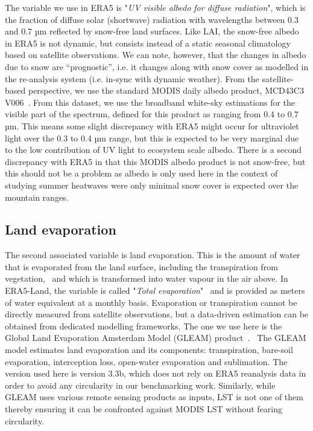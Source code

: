 \documentclass[gmd, manuscript]{copernicus}
\begin{document}
The variable we use in ERA5 is "\emph{UV visible albedo for diffuse radiation}", 
which is the fraction of diffuse solar (shortwave) radiation with wavelengths between 
0.3 and 0.7 µm reflected by snow-free 
land surfaces. Like LAI, the snow-free albedo in ERA5 is not dynamic, but consists instead of a static seasonal climatology based on satellite observations. We can note, however, that the changes in albedo due to snow are “prognostic”, i.e. it changes along with snow cover as modelled in the re-analysis system (i.e. in-sync with dynamic weather).  
From the satellite-based perspective, we use the 
standard MODIS daily albedo product, MCD43C3 V006~\citep{Schaaf_2015}. From this
dataset, we use the broadband white-sky estimations for the visible part of the spectrum, 
defined for this product as ranging from 0.4 to 0.7 
µm. 
This means some slight discrepancy with ERA5 might occur for
ultraviolet light over the 0.3 to 0.4 µm range, 
but this is expected to be very marginal due to the low contribution of UV light to ecosystem
scale albedo. There is a second discrepancy with ERA5 in that this MODIS albedo product is not snow-free, but this should not be a problem as albedo is only used here in the context of 
studying summer heatwaves were only minimal snow cover is expected over the mountain ranges.


\subsection{Land evaporation}

The second associated variable is land evaporation. This is the amount
of water that is evaporated from the land surface, including the
transpiration from vegetation,~ and which is transformed into water
vapour in the air above. In ERA5-Land, the variable is called
"\emph{Total evaporation}"~ and is provided as meters of water
equivalent at a monthly basis. Evaporation or transpiration cannot be
directly measured from satellite observations, but a data-driven
estimation can be obtained from dedicated modelling frameworks. The one
we use here is the Global Land Evaporation Amsterdam Model (GLEAM)
product~\citep{Martens_2017,Miralles_2011}.~ The GLEAM model estimates land evaporation
and its components: transpiration, bare-soil evaporation, interception
loss, open-water evaporation and sublimation. The version used here is
version 3.3b, which does not rely on ERA5 reanalysis data in order to
avoid any circularity in our benchmarking work. Similarly, while GLEAM uses various remote sensing products as inputs, LST is not one of them~\citep{Martens_2017} thereby ensuring it can be confronted against MODIS LST without fearing circularity.
\end{document}
